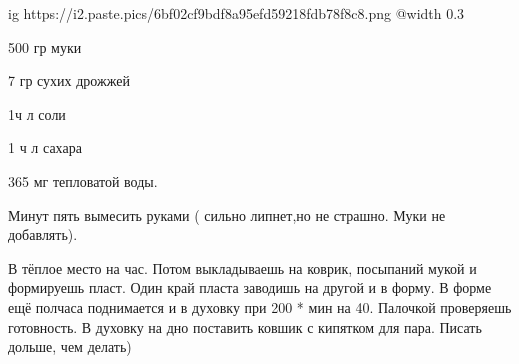 \begin{itemize}

\ifcmt
  ig https://i2.paste.pics/6bf02cf9bdf8a95efd59218fdb78f8c8.png
  @width 0.3
\fi


500 гр муки

7 гр сухих дрожжей

1ч л соли

1 ч л сахара

365 мг тепловатой воды.

Минут пять вымесить руками ( сильно липнет,но не страшно. Муки не добавлять).

В тёплое место на час. Потом выкладываешь на коврик, посыпаний мукой и
формируешь пласт. Один край пласта заводишь на другой и в форму. В форме ещё
полчаса поднимается и в духовку при 200 * мин на 40. Палочкой проверяешь
готовность. В духовку на дно поставить ковшик с кипятком для пара. Писать
дольше, чем делать)


\end{itemize} %
